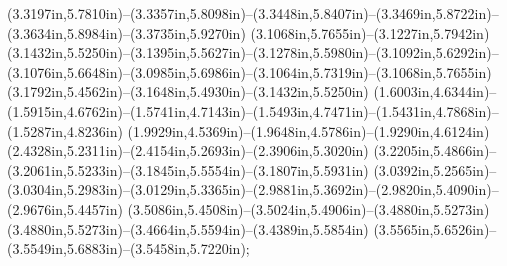 (3.3197in,5.7810in)--(3.3357in,5.8098in)--(3.3448in,5.8407in)--(3.3469in,5.8722in)--(3.3634in,5.8984in)--(3.3735in,5.9270in) (3.1068in,5.7655in)--(3.1227in,5.7942in) (3.1432in,5.5250in)--(3.1395in,5.5627in)--(3.1278in,5.5980in)--(3.1092in,5.6292in)--(3.1076in,5.6648in)--(3.0985in,5.6986in)--(3.1064in,5.7319in)--(3.1068in,5.7655in) (3.1792in,5.4562in)--(3.1648in,5.4930in)--(3.1432in,5.5250in) (1.6003in,4.6344in)--(1.5915in,4.6762in)--(1.5741in,4.7143in)--(1.5493in,4.7471in)--(1.5431in,4.7868in)--(1.5287in,4.8236in) (1.9929in,4.5369in)--(1.9648in,4.5786in)--(1.9290in,4.6124in) (2.4328in,5.2311in)--(2.4154in,5.2693in)--(2.3906in,5.3020in) (3.2205in,5.4866in)--(3.2061in,5.5233in)--(3.1845in,5.5554in)--(3.1807in,5.5931in) (3.0392in,5.2565in)--(3.0304in,5.2983in)--(3.0129in,5.3365in)--(2.9881in,5.3692in)--(2.9820in,5.4090in)--(2.9676in,5.4457in) (3.5086in,5.4508in)--(3.5024in,5.4906in)--(3.4880in,5.5273in) (3.4880in,5.5273in)--(3.4664in,5.5594in)--(3.4389in,5.5854in) (3.5565in,5.6526in)--(3.5549in,5.6883in)--(3.5458in,5.7220in);
